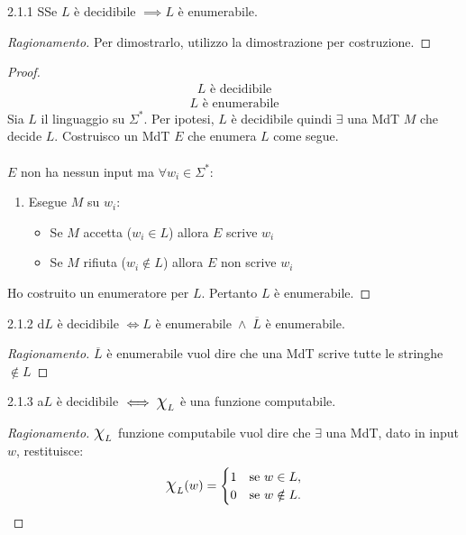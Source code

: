 \documentclass{article}  %
\theoremstyle{definition}
\newenvironment{ragionamento}[1][]
  {\begin{proof}[Ragionamento#1]\renewcommand{\qedsymbol}{}\normalfont}
  {\end{proof}}
\begin{document}
\begin{theorem}{2.1.1}
	SSe $L$ è decidibile $\implies L$ è enumerabile.
	\footnotesize %
	\begin{ragionamento}
		Per dimostrarlo, utilizzo la dimostrazione per costruzione.
	\end{ragionamento}
	\begin{proof}
		\begin{align*}
			L \text{ è decidibile} \tag*{(ipotesi)}
		\end{align*}
		\begin{align*}
			L \text{ è enumerabile} \tag*{(tesi)}
		\end{align*}
		Sia $L$ il linguaggio su $\Sigma^*$. Per ipotesi, $L$ è decidibile quindi $\exists$ una MdT $M$ che decide $L$.
		Costruisco un MdT $E$ che enumera $L$ come segue. \\ \\
		$E$ non ha nessun input ma $\forall{w_i} \in \Sigma^*$:
		\begin{enumerate}
			\item Esegue $M$ su $w_i$:
			      \begin{itemize}
				      \item Se $M$ accetta ($w_i \in L$) allora $E$ scrive $w_i$
				      \item Se $M$ rifiuta ($w_i \notin L$) allora $E$ non scrive $w_i$
			      \end{itemize}
		\end{enumerate}
		Ho costruito un enumeratore per $L$. Pertanto $L$ è enumerabile.
	\end{proof}
\end{theorem}
\begin{theorem}{2.1.2}
	d$L$ è decidibile $\iff L$ è enumerabile$\;\wedge\; \overline{L}$ è enumerabile.
	\footnotesize %
	\begin{ragionamento}
		$\overline{L}$ è enumerabile vuol dire che una MdT scrive tutte le stringhe $\notin L$
	\end{ragionamento}
\end{theorem}
\begin{theorem}{2.1.3}
	a$L$ è decidibile $\iff \mbox{\Large$\chi$}_L$ è una funzione computabile.
	\footnotesize %
	\begin{ragionamento}
		$\mbox{\Large$\chi$}_L$ funzione computabile vuol dire che $\exists$ una MdT, dato in input $w$, restituisce:
		\[
			\mbox{\Large$\chi$}_L(w) =
			\begin{cases}
				1 & \text{se } w \in L,    \\
				0 & \text{se } w \notin L.
			\end{cases}
		\]
	\end{ragionamento}
\end{theorem}
\end{document}
